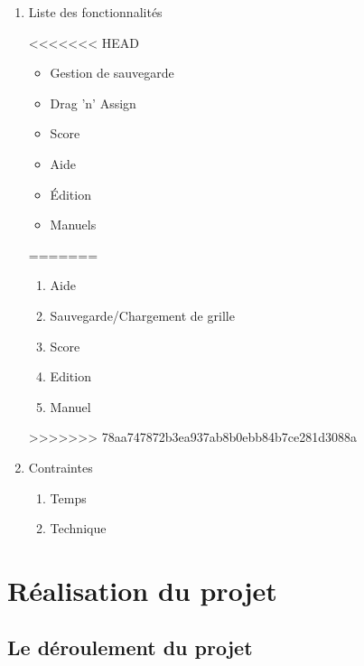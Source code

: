\documentclass[12pt]{beamer}
\begin{document}
   \begin{frame}
   \begin{enumerate}
   \item Liste des fonctionnalités
    
<<<<<<< HEAD
    \begin{itemize}
        \item Gestion de sauvegarde
        \item Drag 'n' Assign
        \item Score
        \item Aide
        \item Édition
        \item Manuels
    \end{itemize}
=======
    \begin{enumerate}
                        
        \item Aide\pause
                        
        \item Sauvegarde/Chargement de grille\pause
                        
        \item Score\pause
                        
        \item Edition\pause
                        
        \item Manuel\pause
    \end{enumerate}
>>>>>>> 78aa747872b3ea937ab8b0ebb84b7ce281d3088a
    
    
    \pause
    \item Contraintes 
    \begin{enumerate}
        \item Temps
        \item Technique
    \end{enumerate}
    
    
    \end{enumerate}
\end{frame}


\section{Réalisation du projet}
\subsection{Le déroulement du projet}
\end{document}
